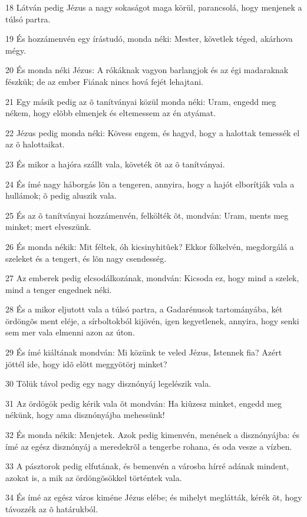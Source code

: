 \par 18 Látván pedig Jézus a nagy sokaságot maga körül, parancsolá, hogy menjenek a túlsó partra.
\par 19 És hozzámenvén egy írástudó, monda néki: Mester, követlek téged, akárhova mégy.
\par 20 És monda néki Jézus: A rókáknak vagyon barlangjok és az égi madaraknak fészkük; de az ember Fiának nincs hová fejét lehajtani.
\par 21 Egy másik pedig az õ tanítványai közül monda néki: Uram, engedd meg nékem, hogy elõbb elmenjek és eltemessem az én atyámat.
\par 22 Jézus pedig monda néki: Kövess engem, és hagyd, hogy a halottak temessék el az õ halottaikat.
\par 23 És mikor a hajóra szállt vala, követék õt az õ tanítványai.
\par 24 És ímé nagy háborgás lõn a tengeren, annyira, hogy a hajót elborítják vala a hullámok; õ pedig aluszik vala.
\par 25 És az õ tanítványai hozzámenvén, felkölték õt, mondván: Uram, ments meg minket; mert elveszünk.
\par 26 És monda nékik: Mit féltek, óh kicsinyhitûek? Ekkor fölkelvén, megdorgálá a szeleket és a tengert, és lõn nagy csendesség.
\par 27 Az emberek pedig elcsodálkozának, mondván: Kicsoda ez, hogy mind a szelek, mind a tenger engednek néki.
\par 28 És a mikor eljutott vala a túlsó partra, a Gadarénusok tartományába, két ördöngõs ment eléje, a sírboltokból kijövén, igen kegyetlenek, annyira, hogy senki sem mer vala elmenni azon az úton.
\par 29 És ímé kiáltának mondván: Mi közünk te veled Jézus, Istennek fia? Azért jöttél ide, hogy idõ elõtt  meggyötörj minket?
\par 30 Tõlük távol pedig egy nagy disznónyáj legelészik vala.
\par 31 Az ördögök pedig kérik vala õt mondván: Ha kiûzesz minket, engedd meg nékünk, hogy ama disznónyájba mehessünk!
\par 32 És monda nékik: Menjetek. Azok pedig kimenvén, menének a disznónyájba: és ímé az egész disznónyáj a meredekrõl a tengerbe rohana, és oda vesze a vízben.
\par 33 A pásztorok pedig elfutának, és bemenvén a városba hírré adának mindent, azokat is, a mik az ördöngõsökkel történtek vala.
\par 34 És ímé az egész város kiméne Jézus elébe; és mihelyt meglátták, kérék õt, hogy távozzék az õ határukból.

